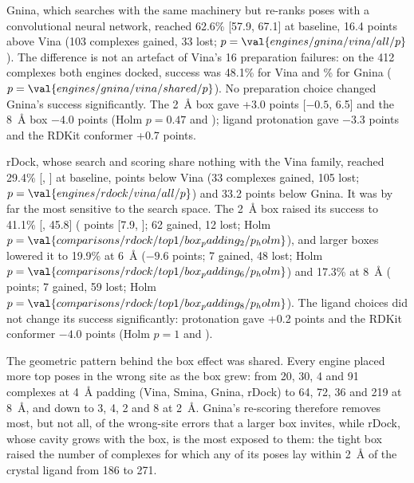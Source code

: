 Gnina, which searches with the same machinery but re-ranks poses with a convolutional
neural network, reached 62.6\% [57.9, 67.1] at baseline, 16.4 points above Vina (103
complexes gained, 33 lost; $p = \val{engines/gnina/vina/all/p}$). The difference is not an artefact of
Vina's 16 preparation failures: on the 412 complexes both engines docked, success was
48.1\% for Vina and \% for Gnina ($p = \val{engines/gnina/vina/shared/p}$). No preparation choice
changed Gnina's success significantly. The \SI{2}{\angstrom} box gave +3.0 points [$-0.5$, 6.5] and the
\SI{8}{\angstrom} box $-4.0$ points (Holm $p = 0.47$ and ); ligand protonation gave
$-3.3$ points and the RDKit conformer +0.7 points.

rDock, whose search and scoring share nothing with the Vina family, reached 29.4\% [,
] at baseline,  points below Vina (33 complexes gained, 105 lost;
$p = \val{engines/rdock/vina/all/p}$) and 33.2 points below Gnina. It was by far the most sensitive to
the search space. The \SI{2}{\angstrom} box raised its success to 41.1\% [, 45.8]
( points [7.9, ]; 62 gained, 12 lost; Holm $p = \val{comparisons/rdock/top1/box_padding_2/p_holm}$), and larger boxes lowered
it to 19.9\% at \SI{6}{\angstrom} ($-9.6$ points; 7 gained, 48 lost; Holm
$p = \val{comparisons/rdock/top1/box_padding_6/p_holm}$) and 17.3\% at \SI{8}{\angstrom} ( points; 7 gained, 59
lost; Holm $p = \val{comparisons/rdock/top1/box_padding_8/p_holm}$). The ligand choices did not change its success
significantly: protonation gave +0.2 points and the RDKit conformer $-4.0$ points (Holm
$p = 1$ and ).

The geometric pattern behind the box effect was shared. Every engine placed more top poses in
the wrong site as the box grew: from 20, 30, 4 and 91 complexes at \SI{4}{\angstrom}
padding (Vina, Smina, Gnina, rDock) to 64, 72, 36 and 219 at \SI{8}{\angstrom}, and down
to 3, 4, 2 and 8 at \SI{2}{\angstrom}. Gnina's re-scoring therefore removes most, but not
all, of the wrong-site errors that a larger box invites, while rDock, whose cavity grows
with the box, is the most exposed to them: the tight box raised the number of complexes for
which any of its poses lay within \SI{2}{\angstrom} of the crystal ligand from 186 to 271.

